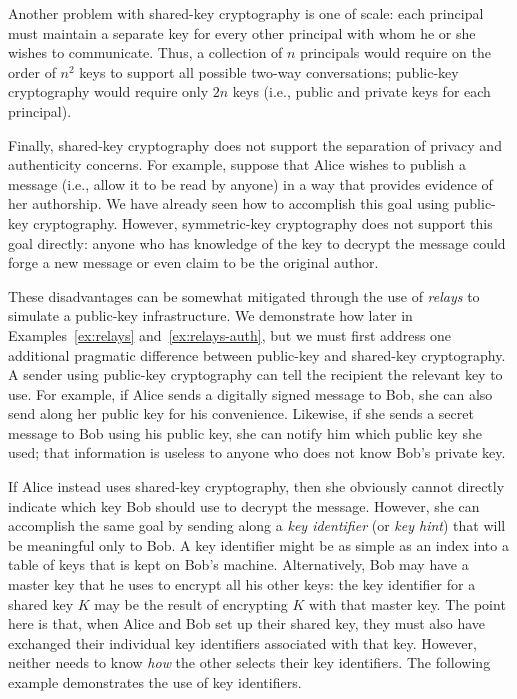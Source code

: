 Another problem with shared-key cryptography is one of scale: each
principal must maintain a separate key for every other principal with
whom he or she wishes to communicate.  Thus, a collection of $n$
principals would require on the order of $n^2$ keys to support all
possible two-way conversations; public-key cryptography would require
only $2n$ keys (i.e., public and private keys for each principal). 

Finally, shared-key cryptography does not support the separation of
privacy and authenticity concerns.  For example, suppose that Alice
wishes to publish a message (i.e., allow it to be read by anyone) in a
way that provides evidence of her authorship.  We have already seen how
to accomplish this goal using public-key cryptography.  However,
symmetric-key cryptography does not support this goal directly: anyone who has
knowledge of the key to decrypt the message could forge a new message or
even claim to be the original author.

These disadvantages can be somewhat mitigated through the use of
\emph{relays} to simulate a public-key infrastructure.  We demonstrate
how later in Examples~\ref{ex:relays} and~\ref{ex:relays-auth}, but we
must first address one additional pragmatic difference between
public-key and shared-key cryptography.  A sender using public-key
cryptography can tell the recipient the relevant key to use.  For
example, if Alice sends a digitally signed message to Bob, she can also
send along her public key for his convenience.  Likewise, if she sends a
secret message to Bob using his public key, she can notify him which
public key she used; that information is useless to anyone who does not
know Bob's private key.

If Alice instead uses shared-key cryptography, then she obviously
cannot directly indicate which key Bob should use to decrypt the
message.  However, she can accomplish the same goal by sending along a
\emph{key identifier} (or \emph{key hint}) that
will be meaningful only to Bob.  A key
identifier might be as simple as an index into a table of keys that is
kept on Bob's machine.  Alternatively, Bob may have a master key that
he uses to encrypt all his other keys: the key identifier for a shared
key $K$ may be the result of encrypting $K$ with that master key.  The
point here is that, when Alice and Bob set up their shared key, they
must also have exchanged their individual key identifiers associated
with that key.  However, neither needs to know \emph{how} the other
selects their key identifiers.  The following example demonstrates the
use of key identifiers.

